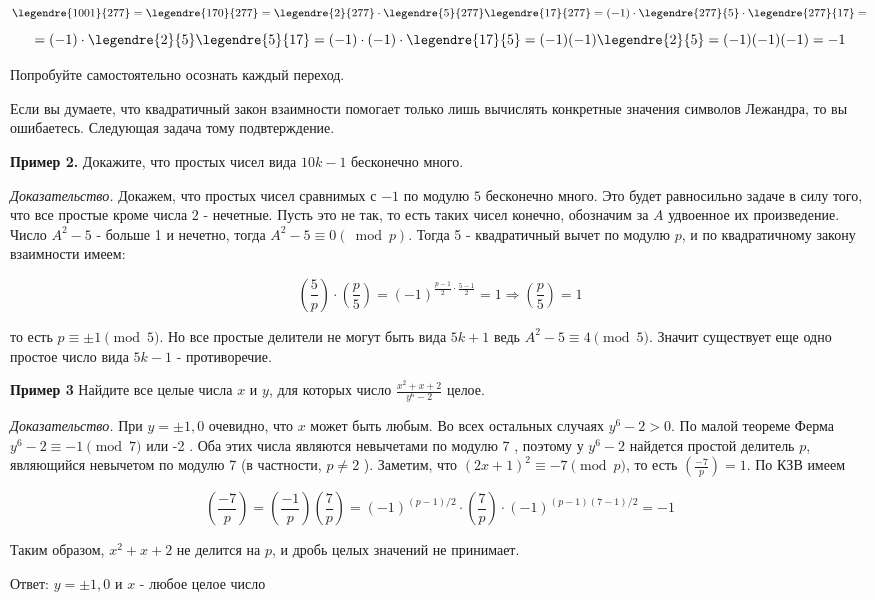 $$
\legendre{1001}{277} = \legendre{170}{277} = \legendre{2}{277} \cdot \legendre{5}{277} \legendre{17}{277} = (-1)\cdot \legendre{277}{5} \cdot \legendre{277}{17} =
$$
$$
=(-1)\cdot \legendre{2}{5}\legendre{5}{17} = (-1)\cdot(-1)\cdot\legendre{17}{5} = (-1)(-1)\legendre{2}{5} = (-1)(-1)(-1) = -1
$$

Попробуйте самостоятельно осознать каждый переход.

Если вы думаете, что квадратичный закон взаимности помогает только лишь вычислять конкретные значения символов Лежандра, то вы ошибаетесь. Следующая задача тому подвтерждение.

\textbf{Пример 2.} 
Докажите, что простых чисел вида $10 k-1$ бесконечно много.

\textit{Доказательство.}
Докажем, что простых чисел сравнимых с $- 1$ по модулю $5$ бесконечно много. Это будет равносильно задаче в силу того, что все простые кроме числа $2$ - нечетные. Пусть это не так, то есть таких чисел конечно, обозначим за $A$ удвоенное их произведение. Число $A^2-5$ - больше 1 и нечетно, тогда $A^2-5 \equiv 0(\bmod p)$. Тогда 5 - квадратичный вычет по модулю $p$, и по квадратичному закону взаимности имеем:

$$
\left(\frac{5}{p}\right) \cdot\left(\frac{p}{5}\right)=(-1)^{\frac{p-1}{2} \cdot \frac{5-1}{2}}=1 \Rightarrow\left(\frac{p}{5}\right)=1
$$


то есть $p \equiv \pm 1 \pmod 5$. Но все простые делители не могут быть вида $5 k+1$ ведь $A^2-5 \equiv 4 \pmod 5$. Значит существует еще одно простое число вида $5 k-1$ - противоречие.

\textbf{Пример 3}
Найдите все целые числа $x$ и $y$, для которых число $\frac{x^2+x+2}{y^6-2}$ целое.

\textit{Доказательство.}
При $y= \pm 1,0$ очевидно, что $x$ может быть любым. Во всех остальных случаях $y^6-2>0$. По малой теореме Ферма $y^6-2 \equiv-1 \pmod{7}$ или -2 . Оба этих числа являются невычетами по модулю 7 , поэтому у $y^6-2$ найдется простой делитель $p$, являющийся невычетом по модулю 7 (в частности, $p \neq 2$ ). Заметим, что $(2 x+1)^2 \equiv-7 \pmod{p}$, то есть $\left(\frac{-7}{p}\right)=1$. По КЗВ имеем

$$
\left(\frac{-7}{p}\right)=\left(\frac{-1}{p}\right)\left(\frac{7}{p}\right)=(-1)^{(p-1) / 2} \cdot\left(\frac{7}{p}\right) \cdot(-1)^{(p-1)(7-1) / 2}=-1
$$


Таким образом, $x^2+x+2$ не делится на $p$, и дробь целых значений не принимает.

Ответ:
$y= \pm 1,0$ и $x$ - любое целое число

